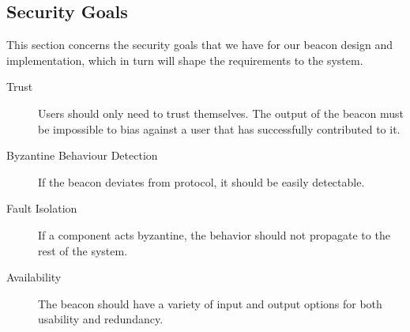 \subsection{Security Goals}
This section concerns the security goals that we have for our beacon design and implementation, which in turn will shape the requirements to the system. 

\begin{description}
    \item [Trust] Users should only need to trust themselves. The output of the beacon must be impossible to bias against a user that has successfully contributed to it. 
    \item [Byzantine Behaviour Detection] If the beacon deviates from protocol, it should be easily detectable.  
    \item [Fault Isolation] If a component acts byzantine, the behavior should not propagate to the rest of the system. 
    \item [Availability] The beacon should have a variety of input and output options for both usability and redundancy. 
\end{description}

